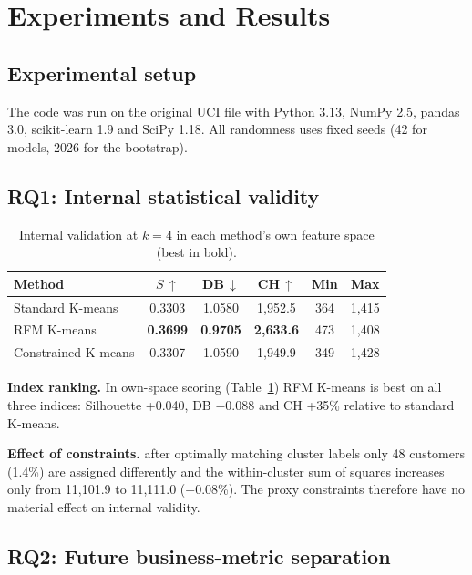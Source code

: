 \documentclass[conference,10pt]{IEEEtran}
\begin{document}
\section{Experiments and Results}
\label{sec:results}

\subsection{Experimental setup}
The code was run on the original UCI file with
Python 3.13, NumPy 2.5, pandas 3.0, scikit-learn 1.9 and SciPy 1.18. All randomness uses
fixed seeds (42 for models, 2026 for the bootstrap).

\subsection{RQ1: Internal statistical validity}
\label{sec:rq1}

\begin{table}[t]
\centering
\caption{Internal validation at $k=4$ in each method's own feature space
(best in bold).}
\label{tab:internal}
\footnotesize
\setlength{\tabcolsep}{3.2pt}
\begin{tabular}{lccccc}
\toprule
\textbf{Method} & \textbf{$S$\,$\uparrow$} & \textbf{DB\,$\downarrow$} &
\textbf{CH\,$\uparrow$} & \textbf{Min} & \textbf{Max}\\
\midrule
Standard K-means    & 0.3303 & 1.0580 & 1,952.5 & 364 & 1,415\\
RFM K-means         & \textbf{0.3699} & \textbf{0.9705} & \textbf{2,633.6} & 473 & 1,408\\
Constrained K-means & 0.3307 & 1.0590 & 1,949.9 & 349 & 1,428\\
\bottomrule
\end{tabular}
\end{table}


\textbf{Index ranking.} In own-space scoring (Table~\ref{tab:internal}) RFM K-means is best on all three indices: Silhouette
+0.040, DB $-0.088$ and CH +35\% relative to standard K-means. 

\textbf{Effect of constraints.} after optimally matching cluster labels only
48 customers (1.4\%) are assigned differently and the within-cluster sum of squares increases only from
11,101.9 to 11,111.0 (+0.08\%). The proxy constraints therefore have no
material effect on internal validity. 


\subsection{RQ2: Future business-metric separation}
\end{document}
